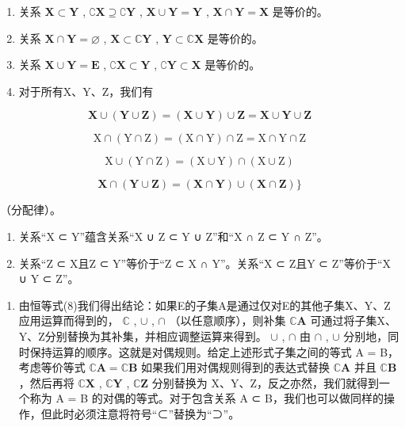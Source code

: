 \begin{enumerate}
\def\labelenumi{(\alph{enumi})}
\setcounter{enumi}{3}
\item
  关系 \(\mathbf{X} \subset \mathbf{Y}\) , \(\complement \mathbf{X} \supseteq \complement \mathbf{Y}\) , \(\mathbf{X} \cup \mathbf{Y} = \mathbf{Y}\) , \(\mathbf{X} \cap \mathbf{Y} = \mathbf{X}\) 是等价的。
\item
  关系 \(\mathbf{X} \cap \mathbf{Y} = \varnothing\) , \(\mathbf{X} \subset \mathbb{C}\mathbf{Y}\) , \(\mathbf{Y} \subset \mathbb{C}\mathbf{X}\) 是等价的。
\item
  关系 \(\mathbf{X} \cup \mathbf{Y} = \mathbf{E}\) , \(\complement \mathbf{X} \subset \mathbf{Y}\) , \(\complement \mathbf{Y} \subset \mathbf{X}\) 是等价的。
\item
  对于所有X、Y、Z，我们有
\end{enumerate}

\[
\mathbf {X} \cup (\mathbf {Y} \cup \mathbf {Z}) = (\mathbf {X} \cup \mathbf {Y}) \cup \mathbf {Z} = \mathbf {X} \cup \mathbf {Y} \cup \mathbf {Z}\tag{9}
\]

\[
\mathrm{X} \cap (\mathrm{Y} \cap \mathrm{Z}) = (\mathrm{X} \cap \mathrm{Y}) \cap \mathrm{Z} = \mathrm{X} \cap \mathrm{Y} \cap \mathrm{Z}\tag{10}
\]

\[
\mathrm{X} \cup (\mathrm{Y} \cap \mathrm{Z}) = (\mathrm{X} \cup \mathrm{Y}) \cap (\mathrm{X} \cup \mathrm{Z})
\]

\[
\mathbf {X} \cap (\mathbf {Y} \cup \mathbf {Z}) = (\mathbf {X} \cap \mathbf {Y}) \cup (\mathbf {X} \cap \mathbf {Z}) \Big \}
\]

（分配律）。

\begin{enumerate}
\def\labelenumi{(\alph{enumi})}
\setcounter{enumi}{7}
\item
  关系“X ⊂ Y”蕴含关系“X ∪ Z ⊂ Y ∪ Z”和“X ∩ Z ⊂ Y ∩ Z”。
\item
  关系“Z ⊂ X且Z ⊂ Y”等价于“Z ⊂ X ∩ Y”。关系“X ⊂ Z且Y ⊂ Z”等价于“X ∪ Y ⊂ Z”。
\end{enumerate}

\begin{enumerate}
\def\labelenumi{\arabic{enumi}.}
\setcounter{enumi}{14}
\tightlist
\item
  由恒等式(8)我们得出结论：如果E的子集A是通过仅对E的其他子集X、Y、Z应用运算而得到的， \(\mathbb{C}\) , \(\cup\) , \(\cap\) （以任意顺序），则补集 \(\mathbb{C}\mathbf{A}\) 可通过将子集X、Y、Z分别替换为其补集，并相应调整运算来得到。 \(\cup\) , \(\cap\) 由 \(\cap\) , \(\cup\) 分别地，同时保持运算的顺序。这就是对偶规则。给定上述形式子集之间的等式 A = B，考虑等价等式 \(\mathbb{C}\mathbf{A} = \mathbb{C}\mathbf{B}\) 如果我们用对偶规则得到的表达式替换 \(\mathbb{C}\mathbf{A}\) 并且 \(\mathbb{C}\mathbf{B}\) ，然后再将 \(\mathbb{C}\mathbf{X}\) , \(\mathbb{C}\mathbf{Y}\) , \(\mathbb{C}\mathbf{Z}\) 分别替换为 X、Y、Z，反之亦然，我们就得到一个称为 A = B 的对偶的等式。对于包含关系 A ⊂ B，我们也可以做同样的操作，但此时必须注意将符号“⊂”替换为“⊃”。
\end{enumerate}

